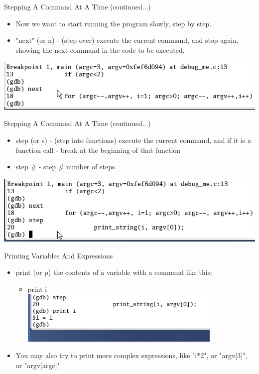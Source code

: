 \documentclass{beamer}
\begin{document}
\begin{frame}{Stepping A Command At A Time (continued...)}
\begin{itemize}
\item Now we want to start running the program slowly, step by step. 
\item "next" (or n) - (step over) execute the current command, and stop again, showing the next command in the code to be executed. 
\end{itemize}
\includegraphics[width=1.0\textwidth]{../imgs/gdb3.png}
\end{frame}

\begin{frame}{Stepping A Command At A Time (continued...)}
\begin{itemize}
\item step (or s) - (step into functions) execute the current command, and if it is a function call - break at the beginning of that function 
\item step \# - step \# number of steps
\end{itemize}
\includegraphics[width=1.0\textwidth]{../imgs/gdb4.png}
\end{frame}

\begin{frame}{Printing Variables And Expressions}
\begin{itemize}
\item print (or p) the contents of a variable with a command like this: 
\begin{itemize}
\item print i \\
\includegraphics[width=0.8\textwidth]{../imgs/gdb5.png}
\end{itemize}
\item You may also try to print more complex expressions, like "i*2", or "argv$[$3$]$", or "argv$[$argc$]$"
\end{itemize}
\end{frame}
\end{document}
